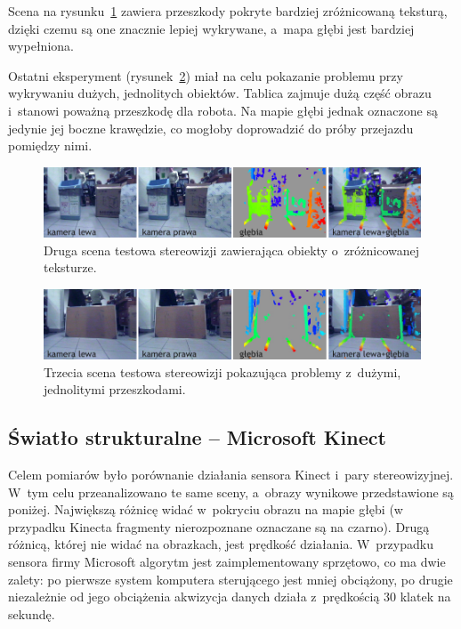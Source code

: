 Scena na rysunku~\ref{fig:stereo_2} zawiera przeszkody pokryte bardziej zróżnicowaną
teksturą, dzięki czemu są one znacznie lepiej wykrywane, a~mapa głębi jest bardziej
wypełniona.

Ostatni eksperyment (rysunek~\ref{fig:stereo_3}) miał na celu pokazanie problemu
przy wykrywaniu dużych, jednolitych obiektów. Tablica zajmuje dużą część obrazu
i~stanowi poważną przeszkodę dla robota. Na mapie głębi jednak oznaczone są jedynie
jej boczne krawędzie, co mogłoby doprowadzić do próby przejazdu pomiędzy nimi.

\begin{figure}[h!]
\centering
\includegraphics{../../Common/img/stereo_2}
\caption[Druga scena testowa stereowizji]{Druga scena testowa stereowizji zawierająca obiekty o~zróżnicowanej teksturze.}
\label{fig:stereo_2}
\end{figure}

\begin{figure}[h!]
\centering
\includegraphics{../../Common/img/stereo_3}
\caption[Trzecia scena testowa stereowizji]{Trzecia scena testowa stereowizji pokazująca problemy z~dużymi, jednolitymi przeszkodami.}
\label{fig:stereo_3}
\end{figure}

\subsection{Światło strukturalne -- Microsoft Kinect}

Celem pomiarów było porównanie działania sensora Kinect i~pary stereowizyjnej.
W~tym celu przeanalizowano te same sceny, a~obrazy wynikowe przedstawione są
poniżej. Największą różnicę widać w~pokryciu obrazu na mapie głębi (w przypadku
Kinecta fragmenty nierozpoznane oznaczane są na czarno). Drugą różnicą, której
nie widać na obrazkach, jest prędkość działania. W~przypadku sensora
firmy Microsoft algorytm jest zaimplementowany sprzętowo, co ma dwie zalety:
po pierwsze system komputera sterującego jest mniej obciążony, po drugie niezależnie
od jego obciążenia akwizycja danych działa z~prędkością 30 klatek na sekundę.

